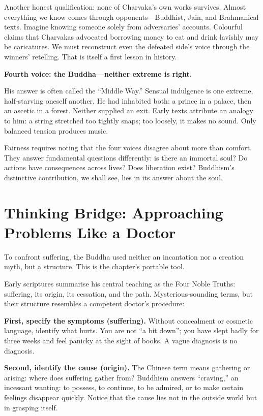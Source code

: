 Another honest qualification: none of Charvaka's own works survives. Almost everything we know comes through opponents---Buddhist, Jain, and Brahmanical texts. Imagine knowing someone solely from adversaries' accounts. Colourful claims that Charvakas advocated borrowing money to eat and drink lavishly may be caricatures. We must reconstruct even the defeated side's voice through the winners' retelling. That is itself a first lesson in history.

\textbf{Fourth voice: the Buddha---neither extreme is right.}

His answer is often called the ``Middle Way.'' Sensual indulgence is one extreme, half-starving oneself another. He had inhabited both: a prince in a palace, then an ascetic in a forest. Neither supplied an exit. Early texts attribute an analogy to him: a string stretched too tightly snaps; too loosely, it makes no sound. Only balanced tension produces music.

Fairness requires noting that the four voices disagree about more than comfort. They answer fundamental questions differently: is there an immortal soul? Do actions have consequences across lives? Does liberation exist? Buddhism's distinctive contribution, we shall see, lies in its answer about the soul.

\section[Thinking Bridge: Think Like a Doctor]{Thinking Bridge: Approaching Problems Like a Doctor}
To confront suffering, the Buddha used neither an incantation nor a creation myth, but a structure. This is the chapter's portable tool.

Early scriptures summarise his central teaching as the Four Noble Truths: suffering, its origin, its cessation, and the path. Mysterious-sounding terms, but their structure resembles a competent doctor's procedure:

\textbf{First, specify the symptoms (suffering).} Without concealment or cosmetic language, identify what hurts. You are not ``a bit down''; you have slept badly for three weeks and feel panicky at the sight of books. A vague diagnosis is no diagnosis.

\textbf{Second, identify the cause (origin).} The Chinese term means gathering or arising: where does suffering gather from? Buddhism answers ``craving,'' an incessant wanting: to possess, to continue, to be admired, or to make certain feelings disappear quickly. Notice that the cause lies not in the outside world but in grasping itself.

